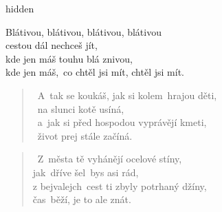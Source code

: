 \begin{song}{}
  \begin{optional}{hidden}
  \end{optional}
\begin{refren}
   Blátivou, blátivou, blátivou, blátivou \\
   cestou dál nechceš jít, \\
   kde jen máš touhu blá znivou, \\
   kde jen máš,~co chtěl jsi mít, chtěl jsi mít.
\end{refren}
\begin{verse}
   ~A~tak se koukáš, jak si kolem~hrajou děti, \\
   ~na slunci kotě usíná, \\
   ~a~jak si před hospodou vyprávějí kmeti, \\
   ~život prej stále začíná.
\end{verse}
\begin{verse}
   ~Z~města tě vyhánějí ocelové stíny, \\
   jak~dříve šel~bys asi rád, \\
   z bejvalejch~cest ti zbyly potrhaný džíny, \\
   čas~běží, je to ale znát.
\end{verse}

\chordbreak
\compactbreak


\end{song}
